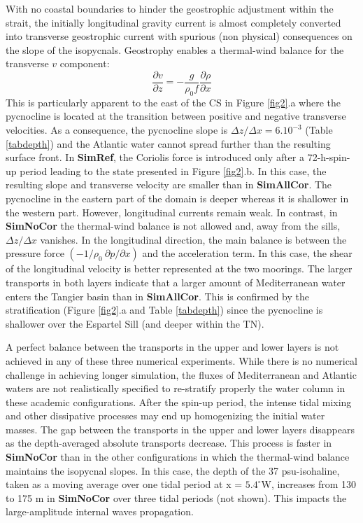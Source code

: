 With no coastal boundaries to hinder the geostrophic adjustment within the strait, the initially longitudinal gravity current is almost completely converted into transverse geostrophic current with spurious (non physical) consequences on the slope of the isopycnals. Geostrophy enables a thermal-wind balance for the transverse $v$ component: 
\begin{equation}  
    \label{Thermal_wind}
    \displaystyle   
	\frac{\partial v}{\partial z}
    =-\frac{g}{\rho_0 f} \frac{\partial \rho}{\partial x}
\end{equation}
This is particularly apparent to the east of the CS in Figure \ref{fig2}.a where the pycnocline is located at the transition between positive and negative transverse velocities. As a consequence, the pycnocline slope is $\Delta z/\Delta x = 6.10^{-3}$ (Table \ref{tabdepth}) and the Atlantic water cannot spread further than the resulting surface front. In \textbf{SimRef}, the Coriolis force is introduced only after a 72-h-spin-up period leading to the state presented in Figure \ref{fig2}.b. In this case, the resulting slope and transverse velocity are smaller than in \textbf{SimAllCor}. %
The pycnocline in the eastern part of the domain is deeper whereas it is shallower in the western part. However, longitudinal currents remain weak. In contrast, in \textbf{SimNoCor} the thermal-wind balance is not allowed and, away from the sills, $\Delta z/\Delta x$ vanishes. In the longitudinal direction, the main balance is between the pressure force $(-1/\rho_0\  \partial p/\partial x)$ and the acceleration term. In this case, the shear of the longitudinal velocity is better represented at the two moorings. The larger transports in both layers indicate that a larger amount of Mediterranean water enters the Tangier basin than in \textbf{SimAllCor}. This is confirmed by the stratification (Figure \ref{fig2}.a and Table \ref{tabdepth}) since the pycnocline is shallower over the Espartel Sill (and deeper within the TN).

A perfect balance between the transports in the upper and lower layers is not achieved in any of these three numerical experiments. While there is no numerical challenge in achieving longer simulation, the fluxes of Mediterranean and Atlantic waters are not realistically specified to re-stratify properly the water column in these academic configurations. After the spin-up period, the intense tidal mixing and other dissipative processes may end up homogenizing the initial water masses. The gap between the transports in the upper and lower layers disappears as the depth-averaged absolute transports decrease. This process is faster in \textbf{SimNoCor} than in the other configurations in which the thermal-wind balance maintains the isopycnal slopes. In this case, the depth of the 37 psu-isohaline, taken as a moving average over one tidal period at x = $5.4^\circ$W, increases from 130 to 175 m in \textbf{SimNoCor} over three tidal periods (not shown). This impacts the large-amplitude internal waves propagation.

